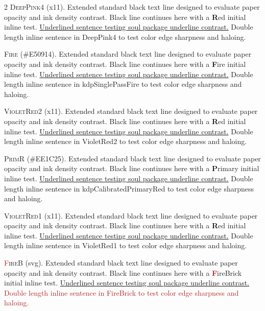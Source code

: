 \begin{multicols}{2}
\lettrine[lines=2]{\textcolor{DeepPink4}{D}}{eepPink4} (x11). Extended standard black text line designed to evaluate paper opacity and ink density contrast. Black line continues here with a \textbf{\textcolor{DeepPink4}{R}}ed initial inline test. \ul{Underlined sentence testing soul package underline contrast.} \textcolor{DeepPink4}{Double length inline sentence in DeepPink4 to test color edge sharpness and haloing.}


\lettrine[lines=2]{\textcolor{kdpSinglePassFire}{F}}{ire} (\#E50914). Extended standard black text line designed to evaluate paper opacity and ink density contrast. Black line continues here with a \textbf{\textcolor{kdpSinglePassFire}{F}}ire initial inline test. \ul{Underlined sentence testing soul package underline contrast.} \textcolor{kdpSinglePassFire}{Double length inline sentence in kdpSinglePassFire to test color edge sharpness and haloing.}


\lettrine[lines=2]{\textcolor{VioletRed2}{V}}{ioletRed2} (x11). Extended standard black text line designed to evaluate paper opacity and ink density contrast. Black line continues here with a \textbf{\textcolor{VioletRed2}{R}}ed initial inline test. \ul{Underlined sentence testing soul package underline contrast.} \textcolor{VioletRed2}{Double length inline sentence in VioletRed2 to test color edge sharpness and haloing.}


\lettrine[lines=2]{\textcolor{kdpCalibratedPrimaryRed}{P}}{rimR} (\#EE1C25). Extended standard black text line designed to evaluate paper opacity and ink density contrast. Black line continues here with a \textbf{\textcolor{kdpCalibratedPrimaryRed}{P}}rimary initial inline test. \ul{Underlined sentence testing soul package underline contrast.} \textcolor{kdpCalibratedPrimaryRed}{Double length inline sentence in kdpCalibratedPrimaryRed to test color edge sharpness and haloing.}


\lettrine[lines=2]{\textcolor{VioletRed1}{V}}{ioletRed1} (x11). Extended standard black text line designed to evaluate paper opacity and ink density contrast. Black line continues here with a \textbf{\textcolor{VioletRed1}{R}}ed initial inline test. \ul{Underlined sentence testing soul package underline contrast.} \textcolor{VioletRed1}{Double length inline sentence in VioletRed1 to test color edge sharpness and haloing.}


\lettrine[lines=2]{\textcolor{FireBrick}{F}}{ireB} (svg). Extended standard black text line designed to evaluate paper opacity and ink density contrast. Black line continues here with a \textbf{\textcolor{FireBrick}{F}}ireBrick initial inline test. \ul{Underlined sentence testing soul package underline contrast.} \textcolor{FireBrick}{Double length inline sentence in FireBrick to test color edge sharpness and haloing.}



\end{multicols}

